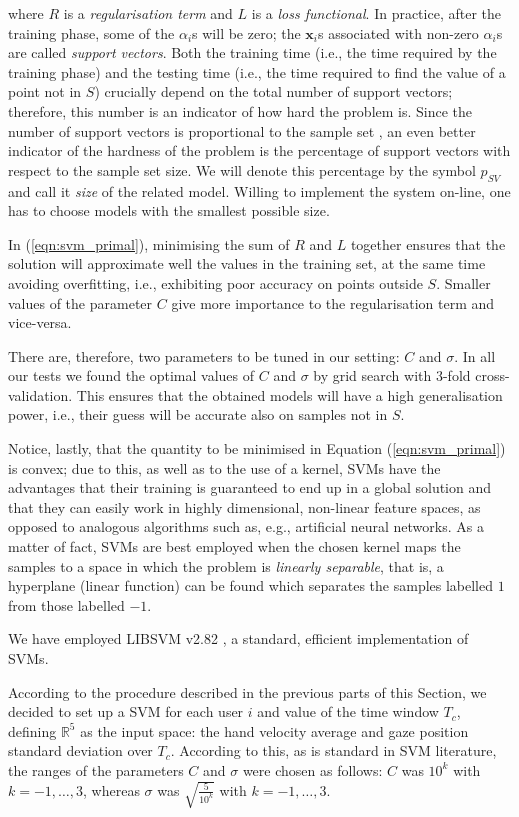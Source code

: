 \documentclass[a4paper,10pt,conference]{ieeeconf}
\def\RR{\mathbb{R}}
\def\xx{\mathbf{x}}
\begin{document}
\noindent where $R$ is a \emph{regularisation term} and $L$ is a
\emph{loss functional}. In practice, after the training phase, some of
the $\alpha_i$s will be zero; the $\xx_i$s associated with non-zero
$\alpha_i$s are called \emph{support vectors}. Both the training time
(i.e., the time required by the training phase) and the testing time
(i.e., the time required to find the value of a point not in $S$)
crucially depend on the total number of support vectors; therefore,
this number is an indicator of how hard the problem is. Since the
number of support vectors is proportional to the sample set
\cite{Steinwart03}, an even better indicator of the hardness of the
problem is the percentage of support vectors with respect to the
sample set size. We will denote this percentage by the symbol $p_{SV}$
and call it \emph{size} of the related model. Willing to implement the
system on-line, one has to choose models with the smallest possible
size.

In (\ref{eqn:svm_primal}), minimising the sum of $R$ and $L$ together
ensures that the solution will approximate well the values in the
training set, at the same time avoiding overfitting, i.e., exhibiting
poor accuracy on points outside $S$. Smaller values of the parameter
$C$ give more importance to the regularisation term and vice-versa.

There are, therefore, two parameters to be tuned in our setting: $C$
and $\sigma$. In all our tests we found the optimal values of $C$ and
$\sigma$ by grid search with $3$-fold cross-validation. This ensures
that the obtained models will have a high generalisation power, i.e.,
their guess will be accurate also on samples not in $S$.

Notice, lastly, that the quantity to be minimised in Equation
(\ref{eqn:svm_primal}) is convex; due to this, as well as to the use
of a kernel, SVMs have the advantages that their training is
guaranteed to end up in a global solution and that they can easily
work in highly dimensional, non-linear feature spaces, as opposed to
analogous algorithms such as, e.g., artificial neural networks. As a
matter of fact, SVMs are best employed when the chosen kernel maps the
samples to a space in which the problem is \emph{linearly separable},
that is, a hyperplane (linear function) can be found which separates
the samples labelled $1$ from those labelled $-1$.

We have employed LIBSVM v2.82 \cite{ChangL01}, a standard, efficient
implementation of SVMs.

According to the procedure described in the previous parts of this
Section, we decided to set up a SVM for each user $i$ and value of the
time window $T_c$, defining $\RR^{5}$ as the input space: the hand
velocity average and gaze position standard deviation over
$T_c$. According to this, as is standard in SVM literature, the ranges
of the parameters $C$ and $\sigma$ were chosen as follows: $C$ was
$10^k$ with $k=-1,\ldots,3$, whereas $\sigma$ was
$\sqrt{\frac{5}{10^{k}}}$ with $k=-1,\ldots,3$.
\end{document}
